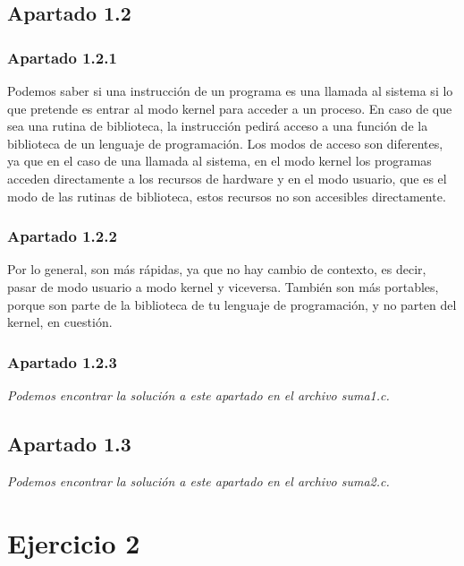 \documentclass[spanish]{article}
\begin{document}
\newpage

\subsection{Apartado 1.2}

\subsubsection{Apartado 1.2.1}

Podemos saber si una instrucción de un programa es una llamada al sistema si lo
que pretende es entrar al modo kernel para acceder a un proceso. En caso de que
sea una rutina de biblioteca, la instrucción pedirá acceso a una función de la
biblioteca de un lenguaje de programación. Los modos de acceso son diferentes,
ya que en el caso de una llamada al sistema, en el modo kernel los programas
acceden directamente a los recursos de hardware y en el modo usuario, que es el
modo de las rutinas de biblioteca, estos recursos no son accesibles
directamente.

\subsubsection{Apartado 1.2.2}

Por lo general, son más rápidas, ya que no hay cambio de contexto, es decir,
pasar de modo usuario a modo kernel y viceversa. También son más portables,
porque son parte de la biblioteca de tu lenguaje de programación, y no parten
del kernel, en cuestión.

\subsubsection{Apartado 1.2.3}

\textit{Podemos encontrar la solución a este apartado en el archivo suma1.c.}

\subsection{Apartado 1.3}

\textit{Podemos encontrar la solución a este apartado en el archivo suma2.c.}

\newpage

\section{Ejercicio 2}
\end{document}
